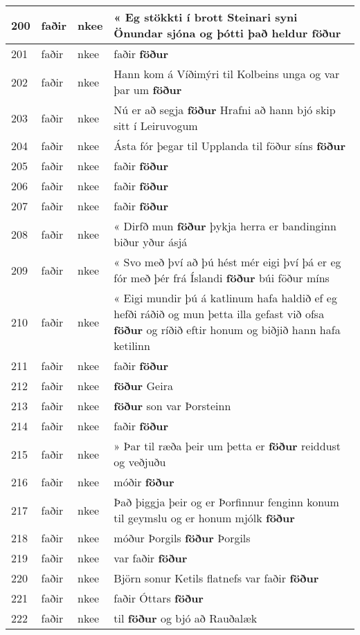 \documentclass{article}
\begin{document}
\begin{longtable}{p{1cm}|p{1cm}|p{1cm}|p{13cm}}
\hline
200&faðir&nkee&« Eg stökkti í brott Steinari syni Önundar sjóna og þótti það heldur \textbf{föður} \\
\hline
201&faðir&nkee&faðir \textbf{föður} \\
\hline
202&faðir&nkee&Hann kom á Víðimýri til Kolbeins unga og var þar um \textbf{föður} \\
\hline
203&faðir&nkee&Nú er að segja \textbf{föður} Hrafni að hann bjó skip sitt í Leiruvogum\\
\hline
204&faðir&nkee&Ásta fór þegar til Upplanda til föður síns \textbf{föður} \\
\hline
205&faðir&nkee&faðir \textbf{föður} \\
\hline
206&faðir&nkee&faðir \textbf{föður} \\
\hline
207&faðir&nkee&faðir \textbf{föður} \\
\hline
208&faðir&nkee&« Dirfð mun \textbf{föður} þykja herra er bandinginn biður yður ásjá\\
\hline
209&faðir&nkee&« Svo með því að þú hést mér eigi því þá er eg fór með þér frá Íslandi \textbf{föður} búi föður míns\\
\hline
210&faðir&nkee&« Eigi mundir þú á katlinum hafa haldið ef eg hefði ráðið og mun þetta illa gefast við ofsa \textbf{föður} og ríðið eftir honum og biðjið hann hafa ketilinn\\
\hline
211&faðir&nkee&faðir \textbf{föður} \\
\hline
212&faðir&nkee& \textbf{föður} Geira\\
\hline
213&faðir&nkee& \textbf{föður} son var Þorsteinn\\
\hline
214&faðir&nkee&faðir \textbf{föður} \\
\hline
215&faðir&nkee&» Þar til ræða þeir um þetta er \textbf{föður} reiddust og veðjuðu\\
\hline
216&faðir&nkee&móðir \textbf{föður} \\
\hline
217&faðir&nkee&Það þiggja þeir og er Þorfinnur fenginn konum til geymslu og er honum mjólk \textbf{föður} \\
\hline
218&faðir&nkee&móður Þorgils \textbf{föður} Þorgils\\
\hline
219&faðir&nkee&var faðir \textbf{föður} \\
\hline
220&faðir&nkee&Björn sonur Ketils flatnefs var faðir \textbf{föður} \\
\hline
221&faðir&nkee&faðir Óttars \textbf{föður} \\
\hline
222&faðir&nkee&til \textbf{föður} og bjó að Rauðalæk\\

\end{longtable}
\end{document}
